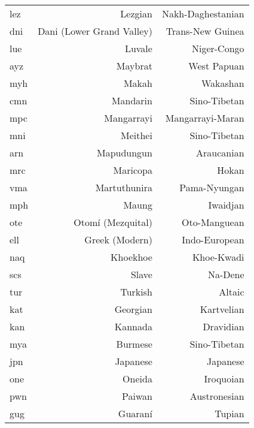 {\begin{longtable}{lrr}
lez                & Lezgian                   & Nakh-Daghestanian    \\
dni                & Dani (Lower Grand Valley) & Trans-New Guinea     \\
lue                & Luvale                    & Niger-Congo          \\
ayz                & Maybrat                   & West Papuan          \\
myh                & Makah                     & Wakashan             \\
cmn                & Mandarin                  & Sino-Tibetan         \\
mpc                & Mangarrayi                & Mangarrayi-Maran     \\
mni                & Meithei                   & Sino-Tibetan         \\
arn                & Mapudungun                & Araucanian           \\
mrc                & Maricopa                  & Hokan                \\
vma                & Martuthunira              & Pama-Nyungan         \\
mph                & Maung                     & Iwaidjan             \\
ote                & Otomí (Mezquital)         & Oto-Manguean         \\
ell                & Greek (Modern)            & Indo-European        \\
naq                & Khoekhoe                  & Khoe-Kwadi           \\
scs                & Slave                     & Na-Dene              \\
tur                & Turkish                   & Altaic               \\
kat                & Georgian                  & Kartvelian           \\
kan                & Kannada                   & Dravidian            \\
mya                & Burmese                   & Sino-Tibetan         \\
jpn                & Japanese                  & Japanese             \\
one                & Oneida                    & Iroquoian            \\
pwn                & Paiwan                    & Austronesian         \\
gug                & Guaraní                   & Tupian               \\

\end{longtable}}
